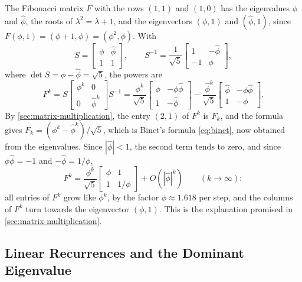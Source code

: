 The Fibonacci matrix $F$ with the rows $(1,1)$ and $(1,0)$ has the eigenvalues $\phi$ and $\hat\phi$, the roots of $\lambda^2=\lambda+1$, and the eigenvectors $(\phi,1)$ and $(\hat\phi,1)$, since $F(\phi,1)=(\phi+1,\phi)=(\phi^2,\phi)$. With
\[
S=\begin{bmatrix}\phi&\hat\phi\\1&1\end{bmatrix},\qquad S^{-1}=\frac1{\sqrt5}\begin{bmatrix}1&-\hat\phi\\-1&\phi\end{bmatrix},
\]
where $\det S=\phi-\hat\phi=\sqrt5$, the powers are
\[
F^k=S\begin{bmatrix}\phi^k&0\\0&\hat\phi^k\end{bmatrix}S^{-1}=\frac{\phi^k}{\sqrt5}\begin{bmatrix}\phi&-\phi\hat\phi\\1&-\hat\phi\end{bmatrix}-\frac{\hat\phi^k}{\sqrt5}\begin{bmatrix}\hat\phi&-\phi\hat\phi\\1&-\phi\end{bmatrix}.
\]
By \cref{sec:matrix-multiplication}, the entry $(2,1)$ of $F^k$ is $F_k$, and the formula gives $F_k=(\phi^k-\hat\phi^k)/\sqrt5$, which is Binet's formula \eqref{eq:binet}, now obtained from the eigenvalues. Since $|\hat\phi|<1$, the second term tends to zero, and since $\phi\hat\phi=-1$ and $-\hat\phi=1/\phi$,
\[
F^k=\frac{\phi^k}{\sqrt5}\begin{bmatrix}\phi&1\\1&1/\phi\end{bmatrix}+O(|\hat\phi|^k)\qquad(k\to\infty):
\]
all entries of $F^k$ grow like $\phi^k$, by the factor $\phi\approx1.618$ per step, and the columns of $F^k$ turn towards the eigenvector $(\phi,1)$. This is the explanation promised in \cref{sec:matrix-multiplication}.

\subsection{Linear Recurrences and the Dominant Eigenvalue}

